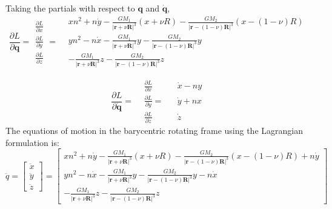 \documentclass[]{aiaa-tc}%
\begin{document}
Taking the partials with respect to $\mathbf{q}$ and $\mathbf{\dot{q}}$,
\begin{equation}
\frac{\partial L}{\partial \mathbf{q}} =
\begin{aligned}
\frac{\partial L}{\partial {x}} \\ 
\frac{\partial L}{\partial {y}} \\ 
\frac{\partial L}{\partial {z}}
\end{aligned}
=
\begin{aligned} 
 &  xn^2+n\dot{y} - \frac{GM_1}{\left | \mathbf{r}+\nu \boldsymbol{\mathbf{R}}  \right |^3} \left ( x+\nu R \right ) - \frac{GM_2}{\left | \mathbf{r}-\left (1-\nu  \right ) \boldsymbol{\mathbf{R}} \right |^3}\left ( x-(1-\nu)R \right ) \\
& yn^2-n\dot{x} - \frac{GM_1}{\left | \mathbf{r}+\nu \boldsymbol{\mathbf{R}}  \right |^3}  y  - \frac{GM_2}{\left | \mathbf{r}-\left (1-\nu  \right ) \boldsymbol{\mathbf{R}} \right |^3} y \\
 & - \frac{GM_1}{\left | \mathbf{r}+\nu \boldsymbol{\mathbf{R}}  \right |^3}  z - \frac{GM_2}{\left | \mathbf{r}-\left (1-\nu  \right ) \boldsymbol{\mathbf{R}} \right |^3} z
\end{aligned}
\end{equation}

\begin{equation}
\frac{\partial L}{\partial \mathbf{\dot{q}}} =
\begin{aligned}
&\frac{\partial L}{\partial \dot{x}} && \dot{x}-ny\\ 
&\frac{\partial L}{\partial \dot{y}} =&& \dot{y}+nx\\ 
&\frac{\partial L}{\partial \dot{z}} && \dot{z}
\end{aligned}
\end{equation}
The equations of motion in the barycentric rotating frame using the Lagrangian formulation is:
\begin{equation}
\ddot{q}=\begin{bmatrix}
\ddot{x}\\ 
\ddot{y}\\ 
\ddot{z}
\end{bmatrix}
=
\begin{bmatrix}
xn^2+n\dot{y} - \frac{GM_1}{\left | \mathbf{r}+\nu \boldsymbol{\mathbf{R}}  \right |^3} \left ( x+\nu R \right ) - \frac{GM_2}{\left | \mathbf{r}-\left (1-\nu  \right ) \boldsymbol{\mathbf{R}} \right |^3}\left ( x-(1-\nu)R \right ) +n\dot{y}\\ 
yn^2-n\dot{x} - \frac{GM_1}{\left | \mathbf{r}+\nu \boldsymbol{\mathbf{R}}  \right |^3}  y  - \frac{GM_2}{\left | \mathbf{r}-\left (1-\nu  \right ) \boldsymbol{\mathbf{R}} \right |^3} y-n\dot{x}\\ 
- \frac{GM_1}{\left | \mathbf{r}+\nu \boldsymbol{\mathbf{R}}  \right |^3}  z - \frac{GM_2}{\left | \mathbf{r}-\left (1-\nu  \right ) \boldsymbol{\mathbf{R}} \right |^3} z
\end{bmatrix}
\end{equation}
\end{document}
